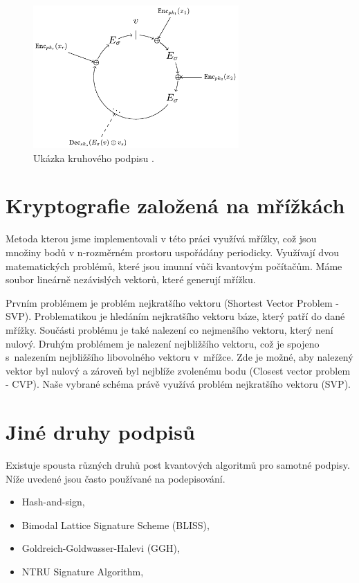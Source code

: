 \begin{figure}[htbp]
  \centering
  \includegraphics[width=0.7\textwidth]{img/ring_signature.pdf}
  \caption{Ukázka kruhového podpisu \cite{Ring signature picture}.}
  \label{Ring signature}
\end{figure}


\section{Kryptografie založená na mřížkách}

Metoda kterou jsme implementovali v této práci využívá mřížky, což jsou množiny bodů v n-rozměrném prostoru uspořádány periodicky. Využívají dvou matematických problémů, které jsou imunní vůči kvantovým počítačům. Máme soubor lineárně nezávislých vektorů, které generují mřížku.

Prvním problémem je problém nejkratšího vektoru (Shortest Vector Problem - SVP). Problematikou je hledáním nejkratšího vektoru báze, který patří do dané mřížky. Součásti problému je také nalezení co nejmenšího vektoru, který není nulový. Druhým problémem je nalezení nejbližšího vektoru, což je spojeno s~nalezením nejbližšího libovolného vektoru v~mřížce. Zde je možné, aby nalezený vektor byl nulový a zároveň byl nejblíže zvolenému bodu (Closest vector problem - CVP). Naše vybrané schéma právě využívá problém nejkratšího vektoru (SVP).


\section{Jiné druhy podpisů}

Existuje spousta různých druhů post kvantových algoritmů pro samotné podpisy. Níže uvedené jsou často používané na podepisování. 

\begin{itemize}
  \item Hash-and-sign,
  \item Bimodal Lattice Signature Scheme (BLISS),
  \item Goldreich-Goldwasser-Halevi (GGH),
  \item NTRU Signature Algorithm,
\end{itemize}

